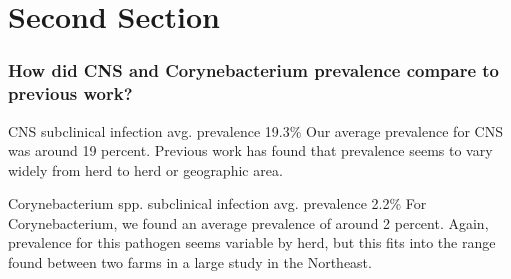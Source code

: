 \documentclass[12pt]{beamer}
\begin{document}
\section{Second Section}
% 

\begin{frame}
\frametitle{How did CNS and Corynebacterium prevalence compare to previous work?}
\begin{block}{CNS subclinical infection avg. prevalence 19.3\%}
Our average prevalence for CNS was around 19 percent. Previous work has found that prevalence seems to vary widely from herd to herd or geographic area.
\end{block}

\begin{block}{Corynebacterium spp. subclinical infection avg. prevalence 2.2\%}
For Corynebacterium, we found an average prevalence of around 2 percent. Again, prevalence for this pathogen seems variable by herd, but this fits into the range found between two farms in a large study in the Northeast.
\end{block}
\end{frame}

% 
% 
\end{document}
